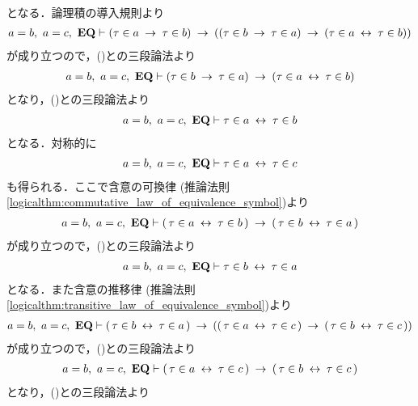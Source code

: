 \begin{sketch}
\begin{align}
		\end{align}
		となる．論理積の導入規則より
		\begin{align}
			a = b,\ a = c,\ \mbox{{\bf EQ}} \vdash (\tau \in a \hspace{0.25em}\rightarrow\hspace{0.25em} \tau \in b)
			\hspace{0.25em}\rightarrow\hspace{0.25em} ((\tau \in b \hspace{0.25em}\rightarrow\hspace{0.25em} \tau \in a) \hspace{0.25em}\rightarrow\hspace{0.25em} 
			(\tau \in a \hspace{0.25em}\leftrightarrow\hspace{0.25em} \tau \in b))
		\end{align}
		が成り立つので，()との三段論法より
		\begin{align}
			a = b,\ a = c,\ \mbox{{\bf EQ}} \vdash (\tau \in b \hspace{0.25em}\rightarrow\hspace{0.25em} \tau \in a) \hspace{0.25em}\rightarrow\hspace{0.25em} 
			(\tau \in a \hspace{0.25em}\leftrightarrow\hspace{0.25em} \tau \in b)
		\end{align}
		となり，()との三段論法より
		\begin{align}
			a = b,\ a = c,\ \EQAX \vdash \tau \in a \lrarrow \tau \in b
			\label{fom:thm_transitive_law_of_equality_4}
		\end{align}
		となる．対称的に
		\begin{align}
			a = b,\ a = c,\ \EQAX \vdash \tau \in a \lrarrow \tau \in c
			\label{fom:thm_transitive_law_of_equality_3}
		\end{align}
		も得られる．ここで含意の可換律
		(推論法則\ref{logicalthm:commutative_law_of_equivalence_symbol})より
		\begin{align}
			a = b,\ a = c,\ \mbox{{\bf EQ}} \vdash (\, \tau \in a \hspace{0.25em}\leftrightarrow\hspace{0.25em} \tau \in b\, )
			\hspace{0.25em}\rightarrow\hspace{0.25em} (\, \tau \in b \hspace{0.25em}\leftrightarrow\hspace{0.25em} \tau \in a\, ) 
		\end{align}
		が成り立つので，()との三段論法より
		\begin{align}
			a = b,\ a = c,\ \EQAX \vdash \tau \in b \lrarrow \tau \in a
			\label{fom:thm_transitive_law_of_equality_5}
		\end{align}
		となる．また含意の推移律
		(推論法則\ref{logicalthm:transitive_law_of_equivalence_symbol})より
		\begin{align}
			a = b,\ a = c,\ \mbox{{\bf EQ}} \vdash (\, \tau \in b \hspace{0.25em}\leftrightarrow\hspace{0.25em} \tau \in a\, )
			\hspace{0.25em}\rightarrow\hspace{0.25em} ((\, \tau \in a \hspace{0.25em}\leftrightarrow\hspace{0.25em} \tau \in c\, )
			\hspace{0.25em}\rightarrow\hspace{0.25em} (\, \tau \in b \hspace{0.25em}\leftrightarrow\hspace{0.25em} \tau \in c\, )) 
		\end{align}
		が成り立つので，()との三段論法より
		\begin{align}
			a = b,\ a = c,\ \mbox{{\bf EQ}} \vdash (\, \tau \in a \hspace{0.25em}\leftrightarrow\hspace{0.25em} \tau \in c\, )
			\hspace{0.25em}\rightarrow\hspace{0.25em} (\, \tau \in b \hspace{0.25em}\leftrightarrow\hspace{0.25em} \tau \in c\, )
		\end{align}
		となり，()との三段論法より
		\begin{align}

\end{align}
\end{sketch}
